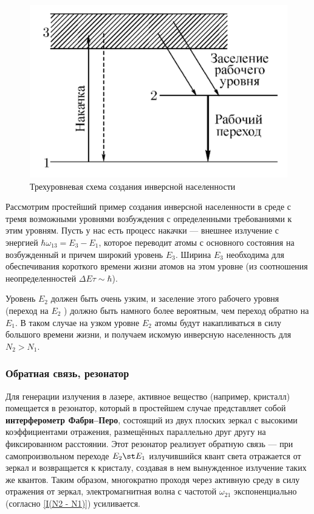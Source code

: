 \documentclass[12pt]{kiarticle}
\begin{document}
\begin{figure} 
	\includegraphics[width=\linewidth]{work}
	\caption{Трехуровневая схема создания инверсной населенности}
	\label{work}
\end{figure}

Рассмотрим простейший пример создания инверсной населенности  в среде с тремя возможными уровнями возбуждения с определенными требованиями к этим уровням. Пусть у нас есть процесс накачки --- внешнее излучение с энергией $ \hbar \omega_{13} = E_3 - E_1 $, которое переводит атомы с основного состояния на возбужденный и причем широкий уровень $ E_3 $. Ширина $ E_3 $ необходима для обеспечивания короткого времени жизни атомов на этом уровне (из соотношения неопределенностей $ \Delta E \tau \sim \hbar $).

Уровень $ E_2 $ должен быть очень узким, и заселение этого рабочего уровня  (переход на  $ E_2 $ ) должно быть намного более вероятным, чем переход обратно на $ E_1 $. В таком случае на узком уровне $ E_2 $ атомы будут накапливаться в силу большого времени жизни, и получаем искомую инверсную населенность для $ N_2 > N_1 $.

 \subsubsection{Обратная связь, резонатор}

Для генерации излучения в лазере, активное вещество (например, кристалл) помещается в резонатор, который в простейшем случае представляет собой \textbf{интерферометр Фабри–Перо}, состоящий из двух плоских зеркал с
высокими коэффициентами отражения, размещённых параллельно друг другу на фиксированном расстоянии. Этот резонатор реализует обратную связь --- при самопроизвольном переходе $ E_2 \st E_1 $ излучившийся квант света отражается от зеркал и возвращается к кристалу, создавая в нем вынужденное излучение таких же квантов. Таким образом, многократно проходя через активную среду в силу отражения от зеркал, электромагнитная волна с частотой $ \omega_{21} $ экспоненциально (согласно \eqref{I(N2 - N1)}) усиливается. 
\end{document}
